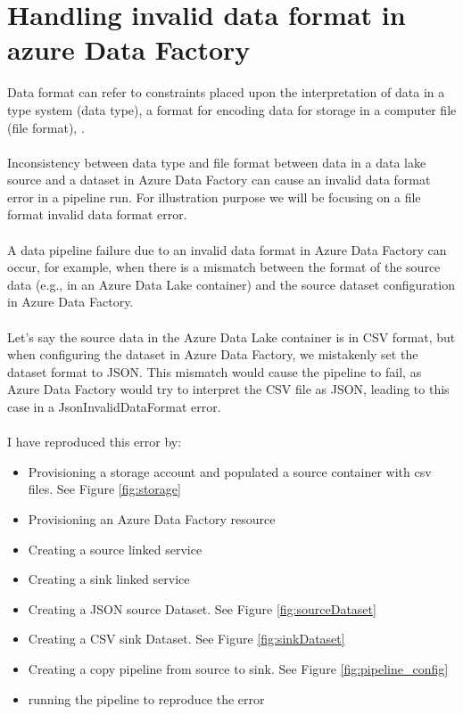 \documentclass[11pt, oneside]{article}   	%
\begin{document}
\section{Handling invalid data format in azure Data Factory}
Data format can refer to constraints placed upon the interpretation of data in a type system (data type), a format for encoding data for storage in a computer file (file format), \cite{wiki}.\\
\\
Inconsistency between data type and file format between data in a data lake source and a dataset in Azure Data Factory can cause an invalid data format error in a pipeline run. For illustration purpose we will be focusing on a file format invalid data format error.\\
\\
A data pipeline failure due to an invalid data format in Azure Data Factory can occur, for example, when there is a mismatch between the format of the source data (e.g., in an Azure Data Lake container) and the source dataset configuration in Azure Data Factory.\\
\\
Let’s say the source data in the Azure Data Lake container is in CSV format, but when configuring the dataset in Azure Data Factory, we mistakenly set the dataset format to JSON. This mismatch would cause the pipeline to fail, as Azure Data Factory would try to interpret the CSV file as JSON, leading to this case in a JsonInvalidDataFormat error.\\
\\
I have reproduced this error by:
\begin{itemize}
        \item Provisioning a storage account and populated a source container with csv files. See Figure \ref{fig:storage}
        \item Provisioning an Azure Data Factory resource
        \item Creating a source linked service
        \item Creating a sink linked service
        \item Creating a JSON source Dataset. See Figure \ref{fig:sourceDataset}
        \item Creating a CSV sink Dataset. See Figure \ref{fig:sinkDataset}
        \item Creating a copy pipeline from source to sink. See Figure \ref{fig:pipeline_config}
          \item running the pipeline to reproduce the error
\end{itemize}
\end{document}
